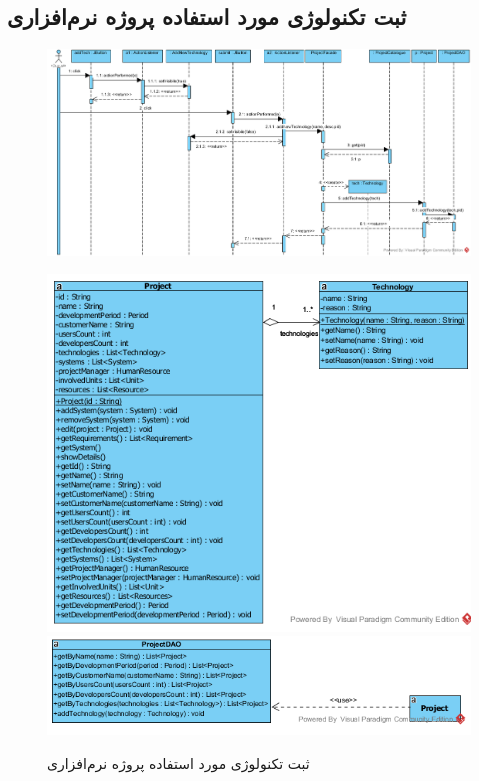 \begin{landscape}
\section{ثبت تکنولوژی مورد استفاده پروژه نرم‌افزاری}
\begin{figure}[H]
	\centering
	\includegraphics[scale=0.7]{img/sequence-design/AddTechnology}
\end{figure}
\begin{figure}[H]
	\centering
	\includegraphics[scale=0.7]{img/sequence-design/AddTechnologyC}
	\includegraphics[scale=0.7]{img/sequence-design/AddTechnologyD}
	\caption{ثبت تکنولوژی مورد استفاده پروژه نرم‌افزاری}
\end{figure}


\end{landscape}
